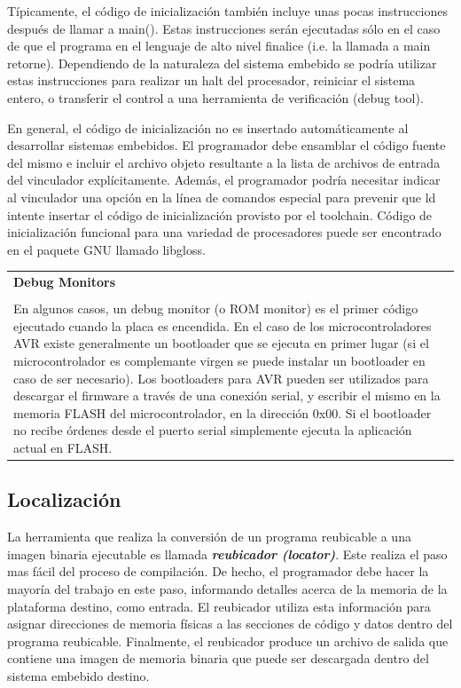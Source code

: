 \documentclass[output=paper, 
colorlinks,
citecolor=brown,
newtxmath
]{langscibook}
\begin{document}
Típicamente, el código de inicialización también incluye unas pocas
instrucciones después de llamar a main(). Estas instrucciones serán ejecutadas
sólo en el caso de que el programa en el lenguaje de alto nivel finalice (i.e.
la llamada a main retorne). Dependiendo de la naturaleza del sistema embebido
se podría utilizar estas instrucciones para realizar un halt del procesador, 
reiniciar el sistema entero, o transferir el control a una herramienta
de verificación (debug tool).

En general, el código de inicialización no es insertado automáticamente al desarrollar sistemas embebidos. El
programador debe ensamblar el código fuente del mismo e incluir el archivo objeto resultante a la 
lista de archivos de entrada del vinculador explícitamente. Además, el programador
podría necesitar indicar al vinculador una opción en la línea de comandos especial
para prevenir que ld intente insertar el código de inicialización provisto
por el toolchain.
Código de inicialización funcional para una variedad de procesadores puede
ser encontrado en el paquete GNU llamado libgloss.


\begin{center}
\begin{tabularx}{\textwidth}{|X|}
\hline
\rowcolor{lightgray}
\textbf{Debug Monitors} \\ \\
En algunos casos, un debug monitor (o ROM monitor) es el primer código
ejecutado cuando la placa es encendida. En el caso de los microcontroladores
AVR existe generalmente un bootloader que se ejecuta en primer lugar (si
el microcontrolador es complemante virgen se puede instalar un 
bootloader en caso de ser necesario).
Los bootloaders para AVR pueden ser utilizados
para descargar el firmware a través de una conexión serial, y escribir
el mismo en la memoria FLASH del microcontrolador, en la dirección 0x00.
Si el bootloader no recibe órdenes desde el puerto serial simplemente 
ejecuta la aplicación actual en FLASH.\\
\hline
\end{tabularx}
\end{center}


\subsection {Localización}

La herramienta que realiza la conversión de un programa reubicable a
una imagen binaria ejecutable es llamada \textit{\textbf{reubicador (locator)}}.
Este realiza el paso mas fácil del proceso de compilación. De hecho, 
el programador debe hacer la mayoría del trabajo en este paso, informando
detalles acerca de la memoria de la plataforma destino, como entrada.
El reubicador utiliza esta información para asignar direcciones
de memoria físicas a las secciones de código y datos dentro del programa
reubicable. Finalmente, el reubicador produce un archivo de salida que contiene
una imagen de memoria binaria que puede ser descargada dentro del sistema
embebido destino.
\end{document}
